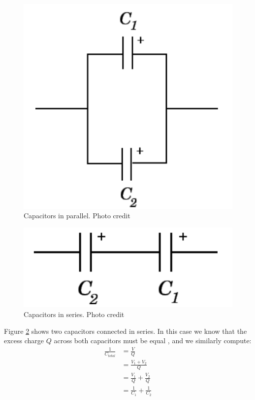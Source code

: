 \documentclass[oneside,12pt]{amsart}
\begin{document}
	\begin{figure}[h]
		\includegraphics[width=\smallgraph,scale=0.01]{Parallel.png}
		\caption{Capacitors in parallel. Photo credit \cite{cap}}
		\label{Parallel}
	\end{figure}
\begin{figure}[h]
	\includegraphics[width=\smallgraph,scale=0.01]{Series.png}
	\caption{Capacitors in series. Photo credit \cite{cap}}
	\label{Series}
\end{figure}

	
	\indent Figure \ref{Series} shows two capacitors connected in series. In this case we know that the excess charge $Q$ across both capacitors must be equal \cite{cap}, and we similarly compute:\\
	\begin{align*}
		\frac{1}{C_{total}} &= \frac{V}{Q}\\
		&= \frac{V_1 + V_2}{Q}\\
		&= \frac{V_1}{Q} + \frac{V_2}{Q}\\
		&= \frac{1}{C_1} + \frac{1}{C_2}
	\end{align*}
\end{document}
